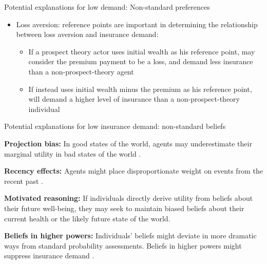 \documentclass[aspectratio=169, 10pt, handout]{beamer}
\newenvironment{wideitemize}{\itemize\addtolength{\itemsep}{10pt}}{\enditemize}
\begin{document}
\begin{frame}{Potential explanations for low demand: Non-standard preferences}
{\begin{itemize}
        \item Loss aversion:
        reference points are important in determining the relationship between loss aversion and insurance demand:
        \begin{itemize}
            \item If a prospect theory actor uses initial wealth as his reference point, may consider the premium payment to be a loss, and  demand less insurance than a non-prospect-theory agent
            \item If instead uses initial wealth minus the premium as his reference point, will demand a higher level of insurance than a non-prospect-theory individual
        \end{itemize} 
    \end{itemize}
}

\end{frame}


\begin{frame}{Potential explanations for low insurance demand: non-standard beliefs}

	\begin{wideitemize}
	
		\item \textbf{Projection bias:} In good states of the world, agents may underestimate their marginal utility in bad states of the world \citep{loewenstein2003projection}.

		\item \textbf{Recency effects:} Agents might place disproportionate weight on events from the recent past \citep{hogarth1992order,fuster2010natural,chang2016something,karlan2014agricultural}.

		\item \textbf{Motivated reasoning:} If individuals directly derive utility from beliefs about their future well-being, they may seek to maintain biased beliefs about their current health or the likely future state of the world.

        \item \textbf{Beliefs in higher powers:} Individuals' beliefs might deviate in more dramatic ways from standard probability assessments. Beliefs in higher powers might suppress insurance demand \citep{auriol2018god}.

	\end{wideitemize}

\end{frame}
\end{document}
